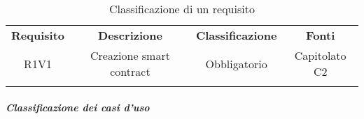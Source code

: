         \begin{longtable}{cccc}
            \rowcolor[HTML]{125E28}
                {\color[HTML]{FFFFFF} \textbf{Requisito}} & {\color[HTML]{FFFFFF} \textbf{Descrizione}}         & {\color[HTML]{FFFFFF} \textbf{Classificazione}} & {\color[HTML]{FFFFFF} \textbf{Fonti}} \\
                \cellcolor[HTML]{b3ffb3}R1V1              &  \cellcolor[HTML]{b3ffb3}Creazione smart contract   &  \cellcolor[HTML]{b3ffb3}Obbligatorio           &  \cellcolor[HTML]{b3ffb3}Capitolato C2\\
                \caption{Classificazione di un requisito}
                \label{tab:my-table}\\
        \end{longtable}

        \subparagraph{Classificazione dei casi d'uso} \label{subparagraph:Classificazione dei casi d'uso}



